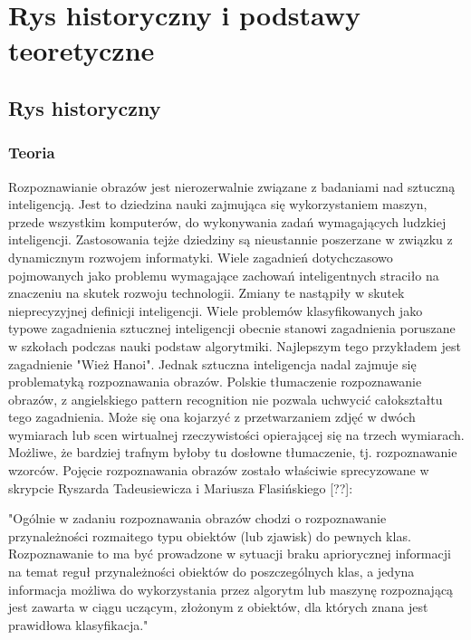 \chapter{Rys historyczny i podstawy teoretyczne}
\label{cha:rysipodstawy}



\section{Rys historyczny}
\label{sec:ryshistoryczny}
\subsection{Teoria}
Rozpoznawianie obrazów jest nierozerwalnie związane z badaniami nad sztuczną inteligencją. Jest to dziedzina nauki zajmująca się wykorzystaniem maszyn, przede wszystkim komputerów, do wykonywania zadań wymagających ludzkiej inteligencji. Zastosowania tejże dziedziny są nieustannie poszerzane w związku z dynamicznym rozwojem informatyki. Wiele zagadnień dotychczasowo pojmowanych jako problemu wymagające zachowań inteligentnych straciło na znaczeniu na skutek rozwoju technologii. Zmiany te nastąpiły w skutek nieprecyzyjnej definicji inteligencji. Wiele problemów klasyfikowanych jako typowe zagadnienia sztucznej inteligencji obecnie stanowi zagadnienia poruszane w szkołach podczas nauki podstaw algorytmiki. Najlepszym tego przykładem jest zagadnienie "Wież Hanoi". Jednak sztuczna inteligencja nadal zajmuje się problematyką rozpoznawania obrazów.
Polskie tłumaczenie rozpoznawanie obrazów, z angielskiego pattern recognition nie pozwala uchwycić całokształtu tego zagadnienia. Może się ona kojarzyć z przetwarzaniem zdjęć w dwóch wymiarach lub scen wirtualnej rzeczywistości opierającej się na trzech wymiarach. Możliwe, że bardziej trafnym byłoby tu dosłowne tłumaczenie, tj. rozpoznawanie wzorców. Pojęcie rozpoznawania obrazów zostało właściwie sprecyzowane w skrypcie Ryszarda Tadeusiewicza i Mariusza Flasińskiego [??]:

"Ogólnie w zadaniu rozpoznawania obrazów chodzi o rozpoznawanie przynależności rozmaitego
typu obiektów (lub zjawisk) do pewnych klas. Rozpoznawanie to ma być prowadzone
w sytuacji braku apriorycznej informacji na temat reguł przynależności obiektów do
poszczególnych klas, a jedyna informacja możliwa do wykorzystania przez algorytm lub
maszynę rozpoznającą jest zawarta w ciągu uczącym, złożonym z obiektów, dla których
znana jest prawidłowa klasyfikacja."

